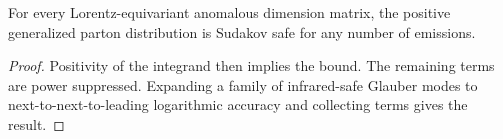 \begin{theorem}\label{thm:1}
For every Lorentz-equivariant anomalous dimension matrix, the positive
generalized parton distribution is Sudakov safe for any number of
emissions.
\end{theorem}

\begin{proof}
Positivity of the integrand then implies the bound. The remaining terms
are power suppressed. Expanding a family of infrared-safe Glauber modes
to next-to-next-to-leading logarithmic accuracy and collecting terms
gives the result.
\end{proof}

